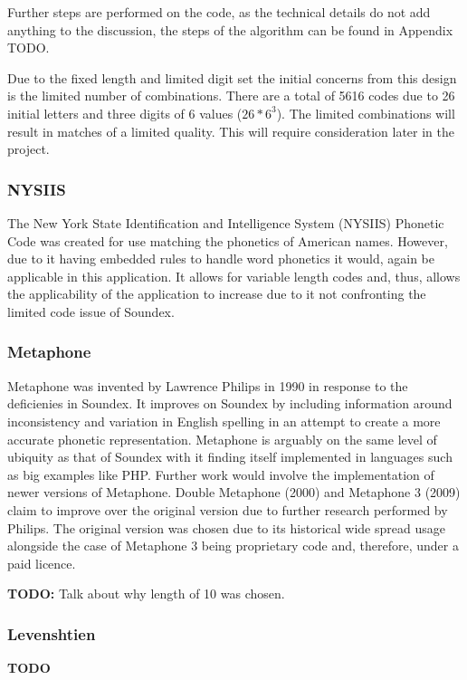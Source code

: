Further steps are performed on the code, as the technical details do not add anything to the discussion, the steps of the algorithm can be found in Appendix TODO.

Due to the fixed length and limited digit set the initial concerns from this design is the limited number of combinations. There are a total of 5616 codes due to 26 initial letters and three digits of 6 values ($26 * 6^3$).
The limited combinations will result in matches of a limited quality. This will require consideration later in the project.

\subsubsection{NYSIIS}
The New York State Identification and Intelligence System (NYSIIS) Phonetic Code was created for use matching the phonetics of American names. However, due to it having embedded rules to handle word phonetics it would, again be applicable in this application. It allows for variable length codes and, thus, allows the applicability of the application to increase due to it not confronting the limited code issue of Soundex.

\subsubsection{Metaphone}
Metaphone was invented by Lawrence Philips in 1990\cite{philips1990hanging} in response to the deficienies in Soundex. It improves on Soundex by including information around inconsistency and variation in English spelling in an attempt to create a more accurate phonetic representation. Metaphone is arguably on the same level of ubiquity as that of Soundex with it finding itself implemented in languages such as big examples like PHP\cite{php}. Further work would involve the implementation of newer versions of Metaphone. Double Metaphone (2000) and Metaphone 3 (2009) claim to improve over the original version due to further research performed by Philips. The original version was chosen due to its historical wide spread usage alongside the case of Metaphone 3 being proprietary code and, therefore, under a paid licence.

\textbf{TODO: } Talk about why length of 10 was chosen.


\subsubsection{Levenshtien}
\textbf{TODO}

